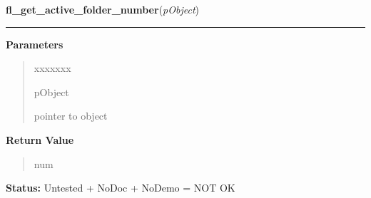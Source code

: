 \hspace{.8\funcindent}\begin{boxedminipage}{\funcwidth}

    \raggedright \textbf{fl\_get\_active\_folder\_number}(\textit{pObject})

    \vspace{-1.5ex}

    \rule{\textwidth}{0.5\fboxrule}
\setlength{\parskip}{2ex}
\setlength{\parskip}{1ex}
      \textbf{Parameters}
      \vspace{-1ex}

      \begin{quote}
        \begin{Ventry}{xxxxxxx}

          \item[pObject]

          pointer to object

        \end{Ventry}

      \end{quote}

      \textbf{Return Value}
    \vspace{-1ex}

      \begin{quote}
      num

      \end{quote}

\textbf{Status:} Untested + NoDoc + NoDemo = NOT OK



    \end{boxedminipage}

    \label{xformslib:library:fl_get_active_folder_name}

    \vspace{0.5ex}

